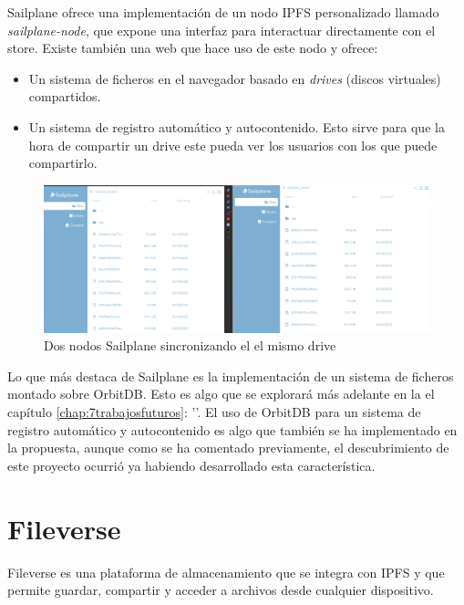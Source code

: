 Sailplane ofrece una implementación de un nodo IPFS personalizado llamado
\\\textit{sailplane-node}\cite{Sailplanenode2023}, que expone una interfaz para interactuar directamente con el store.
Existe también una web que hace uso de este nodo y ofrece:
\begin{itemize}
    \item Un sistema de ficheros en el navegador basado en \textit{drives} (discos virtuales) compartidos.
    \item Un sistema de registro automático y autocontenido. Esto sirve para que la hora de compartir un drive este pueda
          ver los usuarios con los que puede compartirlo.
\end{itemize}

\begin{figure}[H]
    \centering
    \small
    \includegraphics[width=\linewidth]{images/saiplanesynced.png}
    \caption{Dos nodos Sailplane sincronizando el el mismo drive}
    \label{fig:sailplanewebsync}
\end{figure}

Lo que más destaca de Sailplane es  la implementación de un sistema de ficheros montado sobre OrbitDB.
Esto es algo que se explorará más adelante en la el capítulo \ref{chap:7trabajosfuturos}: ''.
El uso de OrbitDB para un sistema de registro automático y autocontenido es algo que también se ha implementado en la propuesta, aunque como se ha
comentado previamente, el descubrimiento de este proyecto ocurrió ya habiendo desarrollado esta característica.

\section{Fileverse}
Fileverse es una plataforma de almacenamiento que se integra con IPFS y que permite guardar, compartir y acceder a archivos desde cualquier dispositivo.


